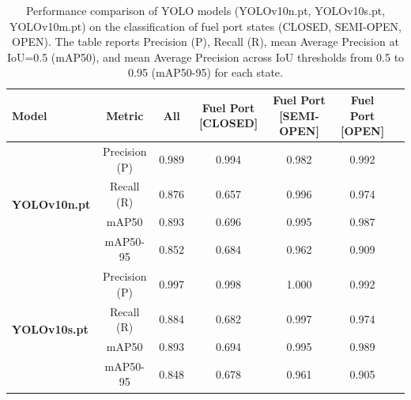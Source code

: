 \documentclass[12pt,oneside]{book} %
\begin{document}
\begin{table}[h!]
    \centering
    \caption{Performance comparison of YOLO models (YOLOv10n.pt, YOLOv10s.pt, YOLOv10m.pt) on the classification of fuel port states (CLOSED, SEMI-OPEN, OPEN). The table reports Precision (P), Recall (R), mean Average Precision at IoU=0.5 (mAP50), and mean Average Precision across IoU thresholds from 0.5 to 0.95 (mAP50-95) for each state.}
    \begin{adjustbox}{max width=\textwidth}
        \begin{tabular}{lcccccc}
            \toprule
            \textbf{Model}                        & \textbf{Metric} & \textbf{All} & \textbf{Fuel Port [CLOSED]} & \textbf{Fuel Port [SEMI-OPEN]} & \textbf{Fuel Port [OPEN]} \\
            \midrule
            \multirow{4}{*}{\textbf{YOLOv10n.pt}} & Precision (P)   & 0.989        & 0.994                       & 0.982                          & 0.992                     \\
                                                  & Recall (R)      & 0.876        & 0.657                       & 0.996                          & 0.974                     \\
                                                  & mAP50           & 0.893        & 0.696                       & 0.995                          & 0.987                     \\
                                                  & mAP50-95        & 0.852        & 0.684                       & 0.962                          & 0.909                     \\
            \midrule
            \multirow{4}{*}{\textbf{YOLOv10s.pt}} & Precision (P)   & 0.997        & 0.998                       & 1.000                          & 0.992                     \\
                                                  & Recall (R)      & 0.884        & 0.682                       & 0.997                          & 0.974                     \\
                                                  & mAP50           & 0.893        & 0.694                       & 0.995                          & 0.989                     \\
                                                  & mAP50-95        & 0.848        & 0.678                       & 0.961                          & 0.905                     \\
            \midrule

\end{tabular}
\end{adjustbox}
\end{table}
\end{document}
